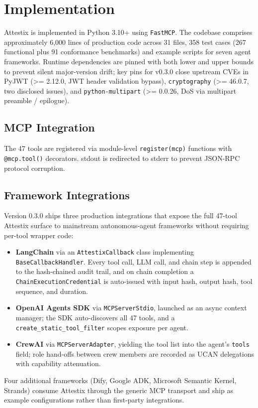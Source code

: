 \documentclass[conference]{IEEEtran}
\begin{document}
\section{Implementation}
\label{sec:implementation}

Attestix is implemented in Python 3.10+ using \texttt{FastMCP}. The codebase comprises approximately 6,000 lines of production code across 31 files, 358 test cases (267 functional plus 91 conformance benchmarks) and example scripts for seven agent frameworks. Runtime dependencies are pinned with both lower and upper bounds to prevent silent major-version drift; key pins for v0.3.0 close upstream CVEs in PyJWT (\textgreater= 2.12.0, JWT header validation bypass), \texttt{cryptography} (\textgreater= 46.0.7, two disclosed issues), and \texttt{python-multipart} (\textgreater= 0.0.26, DoS via multipart preamble / epilogue).

\subsection{MCP Integration}

The 47 tools are registered via module-level \texttt{register(mcp)} functions with \texttt{@mcp.tool()} decorators. stdout is redirected to stderr to prevent JSON-RPC protocol corruption.

\subsection{Framework Integrations}
\label{sec:framework-integrations}

Version 0.3.0 ships three production integrations that expose the full 47-tool Attestix surface to mainstream autonomous-agent frameworks without requiring per-tool wrapper code:
\begin{itemize}
    \item \textbf{LangChain} via an \texttt{AttestixCallback} class implementing \texttt{BaseCallbackHandler}. Every tool call, LLM call, and chain step is appended to the hash-chained audit trail, and on chain completion a \texttt{ChainExecutionCredential} is auto-issued with input hash, output hash, tool sequence, and duration.
    \item \textbf{OpenAI Agents SDK} via \texttt{MCPServerStdio}, launched as an async context manager; the SDK auto-discovers all 47 tools, and a \texttt{create\_static\_tool\_filter} scopes exposure per agent.
    \item \textbf{CrewAI} via \texttt{MCPServerAdapter}, yielding the tool list into the agent's \texttt{tools} field; role hand-offs between crew members are recorded as UCAN delegations with capability attenuation.
\end{itemize}
Four additional frameworks (Dify, Google ADK, Microsoft Semantic Kernel, Strands) consume Attestix through the generic MCP transport and ship as example configurations rather than first-party integrations.
\end{document}
